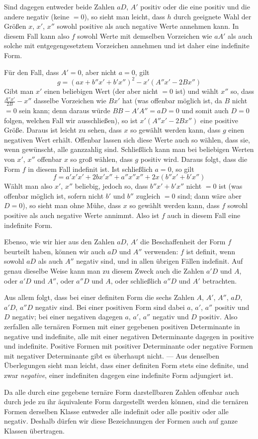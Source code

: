Sind dagegen entweder beide Zahlen $aD$, $A'$ positiv oder die eine positiv und die andere negativ (keine $=0$), so sieht man leicht, dass $h$ durch geeignete Wahl der Größen $x$, $x'$, $x''$ sowohl positive als auch negative Werte annehmen kann. In diesem Fall kann also $f$ sowohl Werte mit demselben Vorzeichen wie $aA'$ als auch solche mit entgegengesetztem Vorzeichen annehmen und ist daher eine indefinite Form.

Für den Fall, dass $A'=0$, aber nicht $a=0$, gilt
\[
g=(ax+b''x'+b'x'')^2-x'(A''x'-2Bx'')
\]
Gibt man $x'$ einen beliebigen Wert (der aber nicht $=0$ ist) und wählt $x''$ so, dass $\frac{A''x'}{2B}-x''$ dasselbe Vorzeichen wie $Bx'$ hat (was offenbar möglich ist, da $B$ nicht $=0$ sein kann; denn daraus würde $BB-A'A''=aD=0$ und somit auch $D=0$ folgen, welchen Fall wir ausschließen), so ist $x'(A''x'-2Bx'')$ eine positive Größe. Daraus ist leicht zu sehen, dass $x$ so gewählt werden kann, dass $g$ einen negativen Wert erhält. Offenbar lassen sich diese Werte auch so wählen, dass sie, wenn gewünscht, alle ganzzahlig sind. Schließlich kann man bei beliebigen Werten von $x'$, $x''$ offenbar $x$ so groß wählen, dass $g$ positiv wird. Daraus folgt, dass die Form $f$ in diesem Fall indefinit ist.
Ist schließlich \(a=0\), so gilt
\[
f=a'x'x'+2bx'x''+a''x''x''+2x(b''x'+b'x'')
\]
Wählt man also \(x'\), \(x''\) beliebig, jedoch so, dass \(b''x'+b'x''\) nicht \(=0\) ist (was offenbar möglich ist, sofern nicht \(b'\) und \(b''\) zugleich \(=0\) sind; dann wäre aber \(D=0\)), so sieht man ohne Mühe, dass \(x\) so gewählt werden kann, dass \(f\) sowohl positive als auch negative Werte annimmt. Also ist \(f\) auch in diesem Fall eine indefinite Form.

Ebenso, wie wir hier aus den Zahlen \(aD\), \(A'\) die Beschaffenheit der Form \(f\) beurteilt haben, können wir auch \(aD\) und \(A''\) verwenden: \(f\) ist definit, wenn sowohl \(aD\) als auch \(A''\) negativ sind, und in allen übrigen Fällen indefinit. Auf genau dieselbe Weise kann man zu diesem Zweck auch die Zahlen \(a'D\) und \(A\), oder \(a'D\) und \(A''\), oder \(a''D\) und \(A\), oder schließlich \(a''D\) und \(A'\) betrachten.

Aus allem folgt, dass bei einer definiten Form die sechs Zahlen \(A\), \(A'\), \(A''\), \(aD\), \(a'D\), \(a''D\) negativ sind. Bei einer positiven Form sind dabei \(a\), \(a'\), \(a''\) positiv und \(D\) negativ; bei einer negativen dagegen \(a\), \(a'\), \(a''\) negativ und \(D\) positiv. Also zerfallen alle ternären Formen mit einer gegebenen positiven Determinante in negative und indefinite, alle mit einer negativen Determinante dagegen in positive und indefinite. Positive Formen mit positiver Determinante oder negative Formen mit negativer Determinante gibt es überhaupt nicht. --- Aus denselben Überlegungen sieht man leicht, dass einer definiten Form stets eine definite, und zwar \emph{negative}, einer indefiniten dagegen eine indefinite Form adjungiert ist.

Da alle durch eine gegebene ternäre Form darstellbaren Zahlen offenbar auch durch jede zu ihr äquivalente Form dargestellt werden können, sind die ternären Formen derselben Klasse entweder alle indefinit oder alle positiv oder alle negativ. Deshalb dürfen wir diese Bezeichnungen der Formen auch auf ganze Klassen übertragen.
